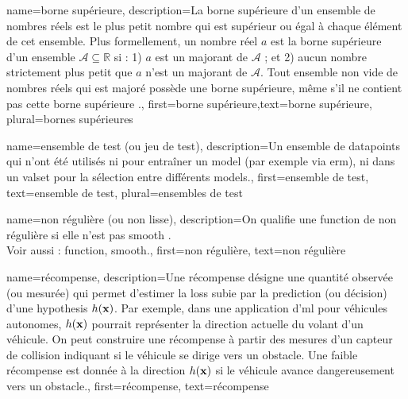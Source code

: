 {name={borne supérieure},
	description={La  borne supérieure d'un ensemble de nombres réels est 
		le plus petit nombre qui est supérieur ou égal à chaque élément de cet ensemble. 
		Plus formellement, un nombre réel $a$ est la borne supérieure d'un ensemble 
		$\mathcal{A} \subseteq \mathbb{R}$ si : 1) $a$ est un majorant de $\mathcal{A}$ ; 
		et 2) aucun nombre strictement plus petit que $a$ n'est un majorant de $\mathcal{A}$. 
		Tout ensemble non vide de nombres réels qui est majoré possède une borne supérieure, même s'il ne 
		contient pas cette borne supérieure \cite[Sec.~1.4]{RudinBookPrinciplesMatheAnalysis}.},
	first={borne supérieure},text={borne supérieure}, plural={bornes supérieures}
}

{name={ensemble de test (ou jeu de test)},
	description={Un ensemble de \glspl{datapoint} qui n'ont été utilisés ni pour entraîner un \gls{model} (par exemple via \gls{erm}), ni dans un \gls{valset} pour la sélection entre différents \glspl{model}.},
	first={ensemble de test},
	text={ensemble de test}, plural={ensembles de test}
}

{name={non régulière (ou non lisse)},
	description={On qualifie une \gls{function} de non régulière si elle n’est pas \gls{smooth} \cite{nesterov04}.
		\\
		Voir aussi : \gls{function}, \gls{smooth}.},
	first={non régulière},
	text={non régulière}
}

{name={récompense},
	description={Une récompense désigne une quantité observée 
		(ou mesurée) qui permet d’estimer la \gls{loss} subie par la \gls{prediction} 
		(ou décision) d’une \gls{hypothesis} $h({\bf x})$. Par exemple, dans une 
		application d'\gls{ml} pour véhicules autonomes, $h({\bf x})$ pourrait représenter 
		la direction actuelle du volant d’un véhicule. On peut construire une récompense à partir 
		des mesures d’un capteur de collision indiquant si le véhicule se dirige vers un obstacle. 
		Une faible récompense est donnée à la direction $h({\bf x})$ si le véhicule 
		avance dangereusement vers un obstacle.},
	first={récompense}, text={récompense}}

